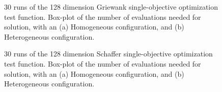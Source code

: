 \documentclass{llncs}
\begin{document}
\begin{figure}[b]
    \centering
      \caption{30 runs of the 128 dimension Griewank single-objective optimization test function. 
    Box-plot of the number of evaluations needed for solution, with an (a) Homogeneous configuration, and (b) Heterogeneous configuration.}
    \label{fig:griewank-evals}
\end{figure}

\begin{figure}[b]
    \centering
 

    \caption{30 runs of the 128 dimension Schaffer single-objective optimization test function. 
    Box-plot of the number of evaluations needed for solution, with an (a) Homogeneous configuration, and (b) Heterogeneous configuration.}
    \label{fig:schaffer-evals}
\end{figure}
\end{document}
